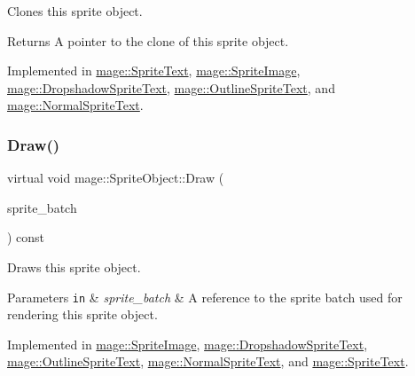 Clones this sprite object.

\begin{DoxyReturn}{Returns}
A pointer to the clone of this sprite object. 
\end{DoxyReturn}


Implemented in \hyperlink{classmage_1_1_sprite_text_a2b9f59a1730f8b9691f173251a2b4944}{mage\+::\+Sprite\+Text}, \hyperlink{classmage_1_1_sprite_image_a61e61349fd3435616893aae787feff37}{mage\+::\+Sprite\+Image}, \hyperlink{classmage_1_1_dropshadow_sprite_text_ae4b94b4120a9cae6bae11b61e7aed39b}{mage\+::\+Dropshadow\+Sprite\+Text}, \hyperlink{classmage_1_1_outline_sprite_text_af8d29408abb61c05a23499bf37c4c7b0}{mage\+::\+Outline\+Sprite\+Text}, and \hyperlink{classmage_1_1_normal_sprite_text_a261996eafdc02f39c6c57eb2b7ec2cea}{mage\+::\+Normal\+Sprite\+Text}.

\hypertarget{classmage_1_1_sprite_object_a1c1c885fe7846f7ee1cc0b73571c2fa0}{}\label{classmage_1_1_sprite_object_a1c1c885fe7846f7ee1cc0b73571c2fa0} 
\subsubsection{\texorpdfstring{Draw()}{Draw()}}
{\footnotesize\ttfamily virtual void mage\+::\+Sprite\+Object\+::\+Draw (\begin{DoxyParamCaption}\item[{Sprite\+Batch \&}]{sprite\+\_\+batch }\end{DoxyParamCaption}) const\hspace{0.3cm}{\ttfamily [pure virtual]}}

Draws this sprite object.


\begin{DoxyParams}[1]{Parameters}
\mbox{\tt in}  & {\em sprite\+\_\+batch} & A reference to the sprite batch used for rendering this sprite object. \\
\hline
\end{DoxyParams}


Implemented in \hyperlink{classmage_1_1_sprite_image_ae30d3293931f674fea17008063755bb6}{mage\+::\+Sprite\+Image}, \hyperlink{classmage_1_1_dropshadow_sprite_text_af76422c9812d7dc38e9b98e587103c67}{mage\+::\+Dropshadow\+Sprite\+Text}, \hyperlink{classmage_1_1_outline_sprite_text_a524e9ad1caeeeaa32405e61d1a5e1032}{mage\+::\+Outline\+Sprite\+Text}, \hyperlink{classmage_1_1_normal_sprite_text_ad2a1b02bea18afd6bf61b106a727a355}{mage\+::\+Normal\+Sprite\+Text}, and \hyperlink{classmage_1_1_sprite_text_a45d5ac8410d5a46b26e8491946a2ad9e}{mage\+::\+Sprite\+Text}.

